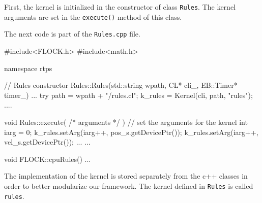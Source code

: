 First, the kernel is initialized in the constructor of class \texttt{Rules}. The kernel 
arguments are set in the \texttt{execute()} method of this class. 

The next code is part of the \texttt{Rules.cpp} file.

\begin{cppcode}{0}
#include<FLOCK.h>
#include<math.h>

namespace rtps
{
	// Rules constructor
	Rules::Rules(std::string wpath, CL* cli_, EB::Timer* timer_)
	{
		...
		try
		{
			path = wpath + "/rules.cl";
			k_rules = Kernel(cli, path, "rules");
		}
		....
	}

	void Rules::execute( /* arguments */ )
	{
		// set the arguments for the kernel
		int iarg = 0;
		k_rules.setArg(iarg++, pos_s.getDevicePtr());
		k_rules.setArg(iarg++, vel_s.getDevicePtr());
		...
	}
	...
	
	void FLOCK::cpuRules()
	{
		...
	}
}
\end{cppcode}

The implementation of the kernel is stored separately from the c++ classes in order to better 
modularize our framework. 
The kernel defined in \texttt{Rules} is called \texttt{rules}. 




